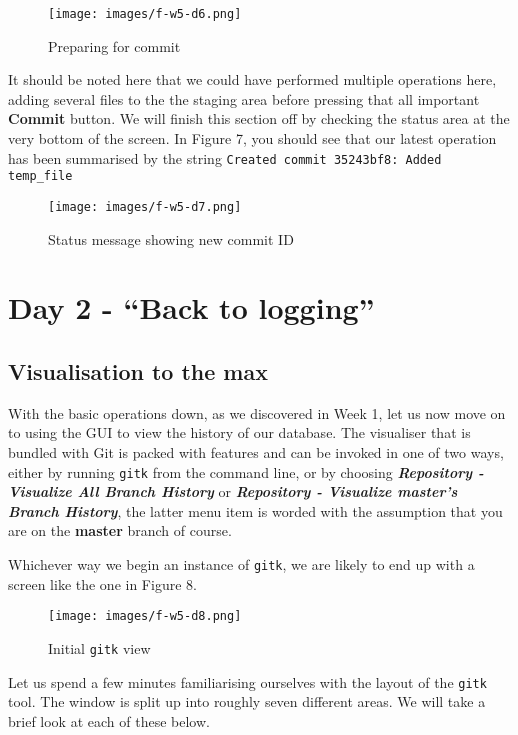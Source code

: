 \begin{figure}[hbt]
\centering
\texttt{[image: images/f-w5-d6.png]}
\caption{Preparing for commit}
\end{figure}

It should be noted here that we could have performed multiple operations here, adding several files to the the staging area before pressing that all important \textbf{Commit} button.  We will finish this section off by checking the status area at the very bottom of the screen.  In Figure 7, you should see that our latest operation has been summarised by the string \texttt{Created commit 35243bf8: Added temp\_file}

\begin{figure}[hbt]
\centering
\texttt{[image: images/f-w5-d7.png]}
\caption{Status message showing new commit ID}
\end{figure}

\section{Day 2 - ``Back to logging''}
\subsection{Visualisation to the max}

With the basic operations down, as we discovered in Week 1, let us now move on to using the GUI to view the history of our database.  The visualiser that is bundled with Git is packed with features and can be invoked in one of two ways, either by running \texttt{gitk} from the command line, or by choosing \textbf{\emph{Repository - Visualize All Branch History}} or \textbf{\emph{Repository - Visualize master's Branch History}}, the latter menu item is worded with the assumption that you are on the \textbf{master} branch of course.

Whichever way we begin an instance of \texttt{gitk}, we are likely to end up with a screen like the one in Figure 8.

\begin{figure}[hbt]
\centering
\texttt{[image: images/f-w5-d8.png]}
\caption{Initial \texttt{gitk} view}
\end{figure} 

Let us spend a few minutes familiarising ourselves with the layout of the \texttt{gitk} tool.  The window is split up into roughly seven different areas.  We will take a brief look at each of these below.

